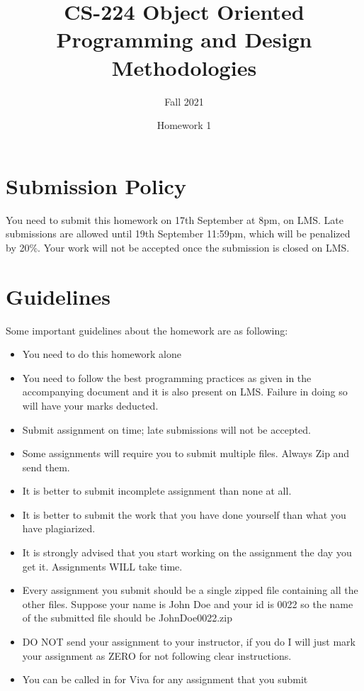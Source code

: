 \documentclass[a4paper,12pt]{article}
\begin{document}
	
	\title{CS-224 Object Oriented Programming and Design Methodologies }
	\author{Fall 2021}
	\date{Homework 1}
	\maketitle
	\section{Submission Policy}
	You need to submit this homework on  {\color{blue}17th September at 8pm}, on LMS. Late submissions are allowed until {\color{red} 19th September 11:59pm}, which will be penalized by 20\%. Your work will not be accepted once the submission is closed on LMS.
	
	\section{Guidelines}
		Some important guidelines about the homework are as following:
	\begin{itemize}
		\item You need to do this homework alone

		\item You need to follow the best programming practices as given in the accompanying document and it is also present on LMS. Failure in doing so will have your marks deducted.
		\item Submit assignment on time; late submissions will not be accepted.
		\item Some assignments will require you to submit multiple files. Always Zip and send them.
		\item It is better to submit incomplete assignment than none at all.
		\item It is better to submit the work that you have done yourself than what you have plagiarized.
		\item It is strongly advised that you start working on the assignment the day you get it. Assignments WILL take time.
		\item Every assignment you submit should be a single zipped file containing all the other files. Suppose your name is John Doe and your id is 0022 so the name of the submitted file should be JohnDoe0022.zip
		\item DO NOT send your assignment to your instructor, if you do I will just mark your assignment as ZERO for not following clear instructions.
		\item You can be called in for Viva for any assignment that you submit
	\end{itemize}
	
\end{document}
